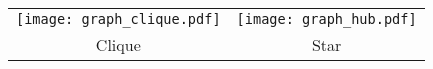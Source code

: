 \documentclass{standalone}
\begin{document}
\begin{tabular}{cc}
\texttt{[image: graph\_clique.pdf]} & \texttt{[image: graph\_hub.pdf]}\\
Clique & Star\\
\end{tabular}
\end{document}
